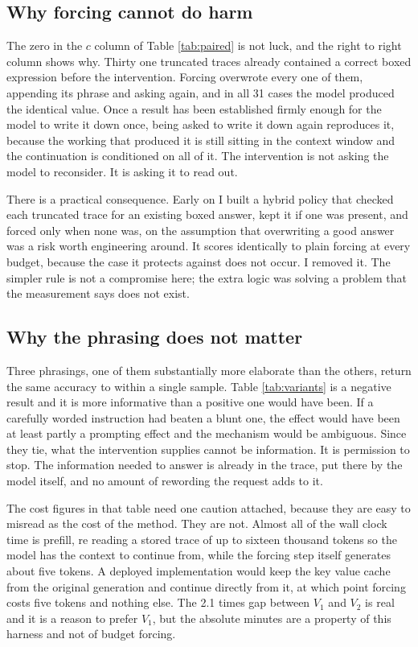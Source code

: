 \documentclass[conference]{IEEEtran}
\begin{document}
\subsection{Why forcing cannot do harm}

The zero in the $c$ column of Table \ref{tab:paired} is not luck, and the right to
right column shows why. Thirty one truncated traces already contained a correct
boxed expression before the intervention. Forcing overwrote every one of them,
appending its phrase and asking again, and in all 31 cases the model produced the
identical value. Once a result has been established firmly enough for the model to
write it down once, being asked to write it down again reproduces it, because the
working that produced it is still sitting in the context window and the
continuation is conditioned on all of it. The intervention is not asking the model
to reconsider. It is asking it to read out.

There is a practical consequence. Early on I built a hybrid policy that checked
each truncated trace for an existing boxed answer, kept it if one was present, and
forced only when none was, on the assumption that overwriting a good answer was a
risk worth engineering around. It scores identically to plain forcing at every
budget, because the case it protects against does not occur. I removed it. The
simpler rule is not a compromise here; the extra logic was solving a problem that
the measurement says does not exist.

\subsection{Why the phrasing does not matter}

Three phrasings, one of them substantially more elaborate than the others, return
the same accuracy to within a single sample. Table \ref{tab:variants} is a
negative result and it is more informative than a positive one would have been.
If a carefully worded instruction had beaten a blunt one, the effect would have
been at least partly a prompting effect and the mechanism would be ambiguous.
Since they tie, what the intervention supplies cannot be information. It is
permission to stop. The information needed to answer is already in the trace, put
there by the model itself, and no amount of rewording the request adds to it.

The cost figures in that table need one caution attached, because they are easy to
misread as the cost of the method. They are not. Almost all of the wall clock time
is prefill, re reading a stored trace of up to sixteen thousand tokens so the
model has the context to continue from, while the forcing step itself generates
about five tokens. A deployed implementation would keep the key value cache from
the original generation and continue directly from it, at which point forcing costs
five tokens and nothing else. The 2.1 times gap between $V_1$ and $V_2$ is real and
it is a reason to prefer $V_1$, but the absolute minutes are a property of this
harness and not of budget forcing.
\end{document}
